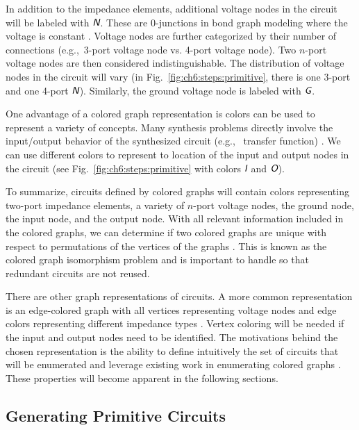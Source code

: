 In addition to the impedance elements, additional voltage nodes in the circuit \cite{Ho1975a} will be labeled with $\textsl{\textsf{N}}$. These are 0-junctions in bond graph modeling where the voltage is constant \cite{Borutzky2010a}.
Voltage nodes are further categorized by their number of connections (e.g.,~3-port voltage node vs. 4-port voltage node). Two $n$-port voltage nodes are then considered indistinguishable.
The distribution of voltage nodes in the circuit will vary (in Fig.~\ref{fig:ch6:steps:primitive}, there is one 3-port and one 4-port $\textsl{\textsf{N}}$).
Similarly, the ground voltage node is labeled with $\textsl{\textsf{G}}$.

One advantage of a colored graph representation is colors can be used to represent a variety of concepts.
Many synthesis problems directly involve the input/output behavior of the synthesized circuit (e.g.,~ transfer function) \cite{Das2007a}.
We can use different colors to represent to location of the input and output nodes in the circuit (see Fig.~\ref{fig:ch6:steps:primitive} with colors $\textsl{\textsf{I}}$ and $\textsl{\textsf{O}}$).

To summarize, circuits defined by colored graphs will contain colors representing two-port impedance elements, a variety of $n$-port voltage nodes, the ground node, the input node, and the output node.
With all relevant information included in the colored graphs, we can determine if two colored graphs are unique with respect to permutations of the vertices of the graphs \cite{Meissner2012a, Herber2017a}.
This is known as the colored graph isomorphism problem and is important to handle so that redundant circuits are not reused.

There are other graph representations of circuits. 
A more common representation is an edge-colored graph with all vertices representing voltage nodes and edge colors representing different impedance types \cite{Gan2010a}.
Vertex coloring will be needed if the input and output nodes need to be identified.
The motivations behind the chosen representation is the ability to define intuitively the set of circuits that will be enumerated and leverage existing work in enumerating colored graphs \cite{Herber2017a}. These properties will become apparent in the following sections.

\subsection{Generating Primitive Circuits \label{sec:ch6:primitive}}

